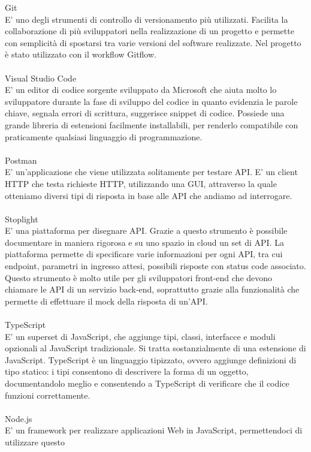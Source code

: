 Git
\\
E' uno degli strumenti di controllo di versionamento più utilizzati. Facilita la collaborazione
di più sviluppatori nella realizzazione di un progetto e permette con semplicità di spostarsi
tra varie versioni del software realizzate. Nel progetto è stato utilizzato con il workflow
Gitflow.
\\\\
Visual Studio Code
\\
E' un editor di codice sorgente sviluppato da Microsoft che aiuta molto lo sviluppatore durante la fase
di sviluppo del codice in quanto evidenzia le parole chiave, segnala errori di scrittura, suggerisce
snippet di codice. Possiede una grande libreria di estensioni facilmente installabili, per renderlo
compatibile con praticamente qualsiasi linguaggio di programmazione.
\\\\
Postman
\\
E' un'applicazione che viene utilizzata solitamente per testare API. E' un client HTTP che testa richieste
HTTP, utilizzando una GUI, attraverso la quale otteniamo diversi tipi di risposta in base alle API che 
andiamo ad interrogare.
\\\\
Stoplight
\\
E' una piattaforma per disegnare API. Grazie a questo strumento è possibile documentare in maniera rigorosa
e su uno spazio in cloud un set di API. La piattaforma permette di specificare varie informazioni per ogni
API, tra cui endpoint, parametri in ingresso attesi, possibili risposte con status code associato. Questo
strumento è molto utile per gli sviluppatori front-end che devono chiamare le API di un servizio
back-end, soprattutto grazie alla funzionalità che permette di effettuare il mock della risposta di un'API.
\\\\
TypeScript
\\
E' un superset di JavaScript, che aggiunge tipi, classi, interfacce e moduli opzionali al JavaScript 
tradizionale. Si tratta sostanzialmente di una estensione di JavaScript.
TypeScript è un linguaggio tipizzato, ovvero aggiunge definizioni di tipo statico: i tipi consentono di 
descrivere la forma di un oggetto, documentandolo meglio e consentendo a TypeScript di verificare che 
il codice funzioni correttamente.
\\\\
Node.js
\\
E' un framework per realizzare applicazioni Web in JavaScript, permettendoci di utilizzare questo 
